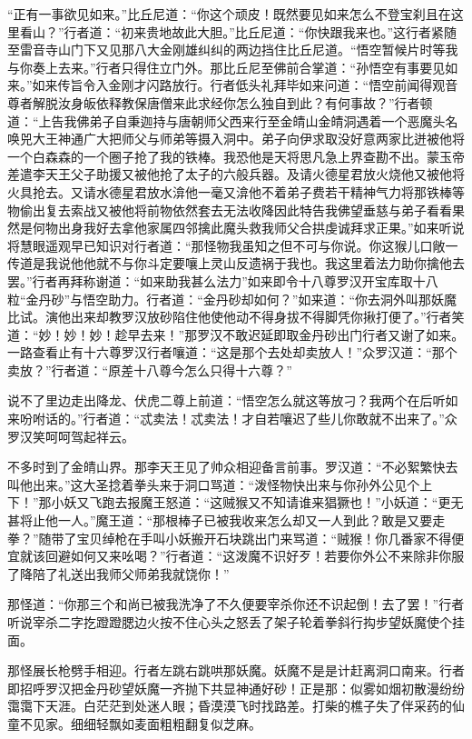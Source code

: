 \documentclass[12pt,UTF8]{ctexbook}
\begin{document}
“正有一事欲见如来。”比丘尼道：“你这个顽皮！既然要见如来怎么不登宝刹且在这里看山？”行者道：“初来贵地故此大胆。”比丘尼道：“你快跟我来也。”这行者紧随至雷音寺山门下又见那八大金刚雄纠纠的两边挡住比丘尼道。“悟空暂候片时等我与你奏上去来。”行者只得住立门外。那比丘尼至佛前合掌道：“孙悟空有事要见如来。”如来传旨令入金刚才闪路放行。行者低头礼拜毕如来问道：“悟空前闻得观音尊者解脱汝身皈依释教保唐僧来此求经你怎么独自到此？有何事故？”行者顿道：“上告我佛弟子自秉迦持与唐朝师父西来行至金皘山金皘洞遇着一个恶魔头名唤兕大王神通广大把师父与师弟等摄入洞中。弟子向伊求取没好意两家比迸被他将一个白森森的一个圈子抢了我的铁棒。我恐他是天将思凡急上界查勘不出。蒙玉帝差遣李天王父子助援又被他抢了太子的六般兵器。及请火德星君放火烧他又被他将火具抢去。又请水德星君放水渰他一毫又渰他不着弟子费若干精神气力将那铁棒等物偷出复去索战又被他将前物依然套去无法收降因此特告我佛望垂慈与弟子看看果然是何物出身我好去拿他家属四邻擒此魔头救我师父合拱虔诚拜求正果。”如来听说将慧眼遥观早已知识对行者道：“那怪物我虽知之但不可与你说。你这猴儿口敞一传道是我说他他就不与你斗定要嚷上灵山反遗祸于我也。我这里着法力助你擒他去罢。”行者再拜称谢道：“如来助我甚么法力”如来即令十八尊罗汉开宝库取十八粒“金丹砂”与悟空助力。行者道：“金丹砂却如何？”如来道：“你去洞外叫那妖魔比试。演他出来却教罗汉放砂陷住他使他动不得身拔不得脚凭你揪打便了。”行者笑道：“妙！妙！妙！趁早去来！”那罗汉不敢迟延即取金丹砂出门行者又谢了如来。一路查看止有十六尊罗汉行者嚷道：“这是那个去处却卖放人！”众罗汉道：“那个卖放？”行者道：“原差十八尊今怎么只得十六尊？”

说不了里边走出降龙、伏虎二尊上前道：“悟空怎么就这等放刁？我两个在后听如来吩咐话的。”行者道：“忒卖法！忒卖法！才自若嚷迟了些儿你敢就不出来了。”众罗汉笑呵呵驾起祥云。

不多时到了金皘山界。那李天王见了帅众相迎备言前事。罗汉道：“不必絮繁快去叫他出来。”这大圣捻着拳头来于洞口骂道：“泼怪物快出来与你孙外公见个上下！”那小妖又飞跑去报魔王怒道：“这贼猴又不知请谁来猖獗也！”小妖道：“更无甚将止他一人。”魔王道：“那根棒子已被我收来怎么却又一人到此？敢是又要走拳？”随带了宝贝绰枪在手叫小妖搬开石块跳出门来骂道：“贼猴！你几番家不得便宜就该回避如何又来吆喝？”行者道：“这泼魔不识好歹！若要你外公不来除非你服了降陪了礼送出我师父师弟我就饶你！”

那怪道：“你那三个和尚已被我洗净了不久便要宰杀你还不识起倒！去了罢！”行者听说宰杀二字扢蹬蹬腮边火按不住心头之怒丢了架子轮着拳斜行抅步望妖魔使个挂面。

那怪展长枪劈手相迎。行者左跳右跳哄那妖魔。妖魔不是是计赶离洞口南来。行者即招呼罗汉把金丹砂望妖魔一齐抛下共显神通好砂！正是那：似雾如烟初散漫纷纷霭霭下天涯。白茫茫到处迷人眼；昏漠漠飞时找路差。打柴的樵子失了伴采药的仙童不见家。细细轻飘如麦面粗粗翻复似芝麻。
\end{document}
